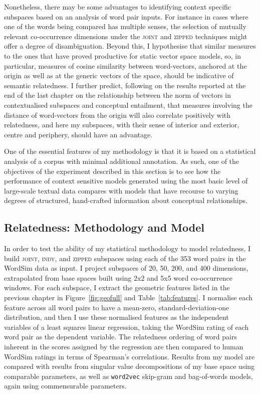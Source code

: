 Nonetheless, there may be some advantages to identifying context specific subspaces based on an analysis of word pair inputs.  For instance in cases where one of the words being compared has multiple senses, the selection of mutually relevant co-occurrence dimensions under the \textsc{joint} and \textsc{zipped} techniques might offer a degree of disambiguation.  Beyond this, I hypothesise that similar measures to the ones that have proved productive for static vector space models, so, in particular, measures of cosine similarity between word-vectors, anchored at the origin as well as at the generic vectors of the space, should be indicative of semantic relatedness.  I further predict, following on the results reported at the end of the last chapter on the relationship between the norm of vectors in contextualised subspaces and conceptual entailment, that measures involving the distance of word-vectors from the origin will also correlate positively with relatedness, and here my subspaces, with their sense of interior and exterior, centre and periphery, should have an advantage.

One of the essential features of my methodology is that it is based on a statistical analysis of a corpus with minimal additional annotation.  As such, one of the objectives of the experiment described in this section is to see how the performance of context sensitive models generated using the most basic level of large-scale textual data compares with models that have recourse to varying degrees of structured, hand-crafted information about conceptual relationships.

\subsection{Relatedness: Methodology and Model} \label{sec:relmeth}
In order to test the ability of my statistical methodology to model relatedness, I build \textsc{joint}, \textsc{indy}, and \textsc{zipped} subspaces using each of the 353 word pairs in the WordSim data as input.  I project subspaces of 20, 50, 200, and 400 dimensions, extrapolated from base spaces built using 2x2 and 5x5 word co-occurrence windows.  For each subspace, I extract the geometric features listed in the previous chapter in Figure~\ref{fig:geofull} and Table~\ref{tab:features}.  I normalise each feature across all word pairs to have a mean-zero, standard-deviation-one distribution, and then I use these normalised features as the independent variables of a least squares linear regression, taking the WordSim rating of each word pair as the dependent variable.  The relatedness ordering of word pairs inherent in the scores assigned by the regression are then compared to human WordSim ratings in terms of Spearman's correlations.  Results from my model are compared with results from singular value decompositions of my base space using comparable parameters, as well as \texttt{word2vec} skip-gram and bag-of-words models, again using commensurable parameters.

